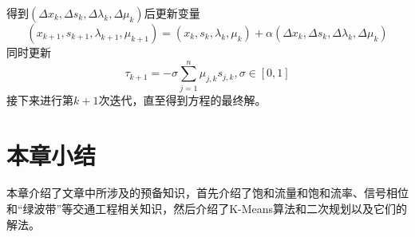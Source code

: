 得到$(\Delta x_k, \Delta s_k, \Delta \lambda_k, \Delta \mu_k )$后更新变量
\begin{equation}
	(x_{k+1}, s_{k+1}, \lambda_{k+1}, \mu_{k+1}) = (x_k, s_k, \lambda_k, \mu_k ) + \alpha (\Delta x_k, \Delta s_k, \Delta \lambda_k, \Delta \mu_k )
\end{equation}
同时更新
\begin{equation}
	\tau_{k+1} = - \sigma \sum_{j=1}^{n}\mu_{j,k}s_{j,k},\sigma \in [0,1]
\end{equation}
接下来进行第${k+1}$次迭代，直至得到方程的最终解。








\section{本章小结}
本章介绍了文章中所涉及的预备知识，首先介绍了饱和流量和饱和流率、信号相位和“绿波带”等交通工程相关知识，然后介绍了K-Means算法和二次规划以及它们的解法。
\label{ch2}



